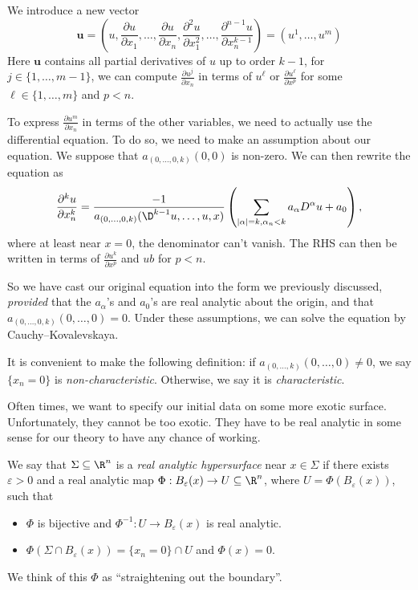 \documentclass[a4paper]{article}
\begin{document}
We introduce a new vector
\[
  \mathbf{u} = \left(u, \frac{\partial u}{\partial x_1}, \ldots, \frac{\partial u}{\partial x_n}, \frac{\partial^2 u}{\partial x_1^2}, \ldots, \frac{\partial^{n - 1} u}{\partial x_n^{k - 1}}\right) = (u^1, \ldots, u^m)
\]
Here $\mathbf{u}$ contains all partial derivatives of $u$ up to order $k - 1$, for $j \in \{1, \ldots, m - 1\}$, we can compute $\frac{\partial u^j}{\partial x_n}$ in terms of $u^\ell$ or $\frac{\partial u^\ell}{\partial x^p}$ for some $\ell \in \{1, \ldots, m\}$ and $p < n$.

To express $\frac{\partial u^m}{\partial x_n}$ in terms of the other variables, we need to actually use the differential equation. To do so, we need to make an assumption about our equation. We suppose that $a_{(0, \ldots, 0, k)}(0, 0)$ is non-zero. We can then rewrite the equation as
\[
  \frac{\partial^k u}{\partial x_n^k} = \frac{-1}{a_{(0, \ldots, 0, k)}(\D^{k - 1}u, \ldots, u, x)} \left(\sum_{|\alpha| = k, \alpha_n < k} a_\alpha D^\alpha u + a_0\right),
\]
where at least near $x = 0$, the denominator can't vanish. The RHS can then be written in terms of $\frac{\partial u^k}{\partial x^p}$ and $ub$ for $p < n$.

So we have cast our original equation into the form we previously discussed, \emph{provided} that the $a_\alpha$'s and $a_0$'s are real analytic about the origin, and that $a_{(0, \ldots, 0, k)}(0, \ldots, 0) = 0$. Under these assumptions, we can solve the equation by Cauchy--Kovalevskaya.

It is convenient to make the following definition: if $a_{(0, \ldots, k)} (0, \ldots, 0) \not= 0$, we say $\{x_n = 0\}$ is \emph{non-characteristic}. Otherwise, we say it is \emph{characteristic}.

Often times, we want to specify our initial data on some more exotic surface. Unfortunately, they cannot be too exotic. They have to be real analytic in some sense for our theory to have any chance of working.

\begin{defi}
  We say that $\Sigma \subseteq \R^n$ is a \emph{real analytic hypersurface} near $x \in \Sigma$ if there exists $\varepsilon > 0$ and a real analytic map $\Phi: B_\varepsilon(x) \to U \subseteq \R^n$, where $U = \Phi(B_\varepsilon(x))$, such that
  \begin{itemize}
    \item $\Phi$ is bijective and $\Phi^{-1}: U \to B_\varepsilon(x)$ is real analytic.
    \item $\Phi(\Sigma \cap B_\varepsilon(x)) = \{x_n = 0 \} \cap U$ and $\Phi(x) = 0$.
  \end{itemize}
\end{defi}
We think of this $\Phi$ as ``straightening out the boundary''.
\end{document}
